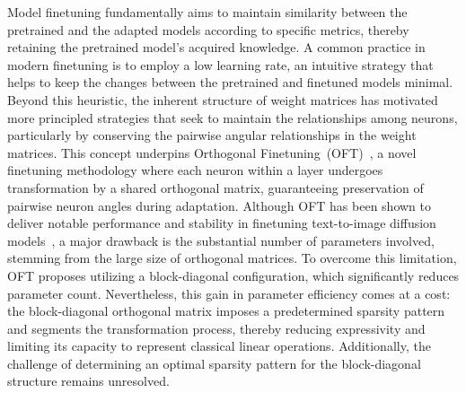 Model finetuning fundamentally aims to maintain similarity between the pretrained and the adapted models according to specific metrics, thereby retaining the pretrained model’s acquired knowledge. A common practice in modern finetuning is to employ a low learning rate, an intuitive strategy that helps to keep the changes between the pretrained and finetuned models minimal. Beyond this heuristic, the inherent structure of weight matrices has motivated more principled strategies that seek to maintain the relationships among neurons, particularly by conserving the pairwise angular relationships in the weight matrices. This concept underpins Orthogonal Finetuning~(OFT)~\cite{qiu2023controlling}, a novel finetuning methodology where each neuron within a layer undergoes transformation by a shared orthogonal matrix, guaranteeing preservation of pairwise neuron angles during adaptation. Although OFT has been shown to deliver notable performance and stability in finetuning text-to-image diffusion models~\cite{qiu2023controlling}, a major drawback is the substantial number of parameters involved, stemming from the large size of orthogonal matrices. To overcome this limitation, OFT proposes utilizing a block-diagonal configuration, which significantly reduces parameter count. Nevertheless, this gain in parameter efficiency comes at a cost: the block-diagonal orthogonal matrix imposes a predetermined sparsity pattern and segments the transformation process, thereby reducing expressivity and limiting its capacity to represent classical linear operations. Additionally, the challenge of determining an optimal sparsity pattern for the block-diagonal structure remains unresolved.

